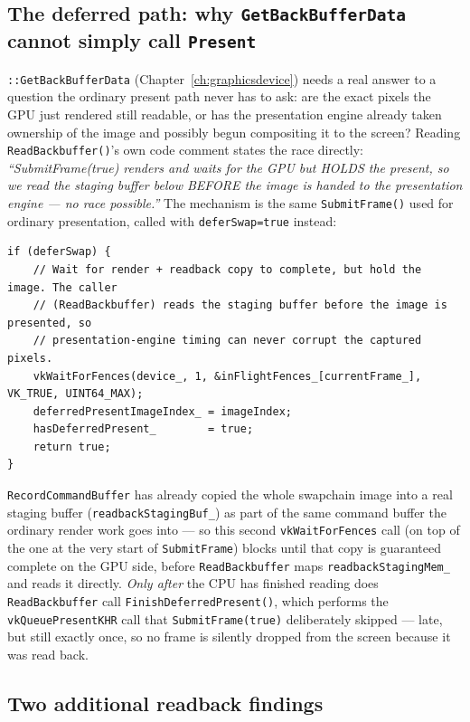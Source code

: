 \subsection{The deferred path: why \texttt{GetBackBufferData} cannot simply call \texttt{Present}}

\texttt{::GetBackBufferData} (Chapter~\ref{ch:graphicsdevice}) needs a
real answer to a question the ordinary present path never has to ask: are the exact pixels the
GPU just rendered still readable, or has the presentation engine already taken ownership of
the image and possibly begun compositing it to the screen? Reading
\texttt{ReadBackbuffer()}'s own code comment states the race directly: \emph{``SubmitFrame(true)
renders and waits for the GPU but HOLDS the present, so we read the staging buffer below
BEFORE the image is handed to the presentation engine --- no race possible.''} The mechanism is
the same \texttt{SubmitFrame()} used for ordinary presentation, called with
\texttt{deferSwap=true} instead:

\begin{lstlisting}
if (deferSwap) {
    // Wait for render + readback copy to complete, but hold the image. The caller
    // (ReadBackbuffer) reads the staging buffer before the image is presented, so
    // presentation-engine timing can never corrupt the captured pixels.
    vkWaitForFences(device_, 1, &inFlightFences_[currentFrame_], VK_TRUE, UINT64_MAX);
    deferredPresentImageIndex_ = imageIndex;
    hasDeferredPresent_        = true;
    return true;
}
\end{lstlisting}

\texttt{RecordCommandBuffer} has already copied the whole swapchain image into a real staging
buffer (\texttt{readbackStagingBuf\_}) as part of the same command buffer the ordinary render
work goes into --- so this second \texttt{vkWaitForFences} call (on top of the one at the very
start of \texttt{SubmitFrame}) blocks until that copy is guaranteed complete on the GPU side,
before \texttt{ReadBackbuffer} maps \texttt{readbackStagingMem\_} and reads it directly.
\emph{Only after} the CPU has finished reading does \texttt{ReadBackbuffer} call
\texttt{FinishDeferredPresent()}, which performs the \texttt{vkQueuePresentKHR} call that
\texttt{SubmitFrame(true)} deliberately skipped --- late, but still exactly once, so no frame
is silently dropped from the screen because it was read back.

\subsection{Two additional readback findings}

